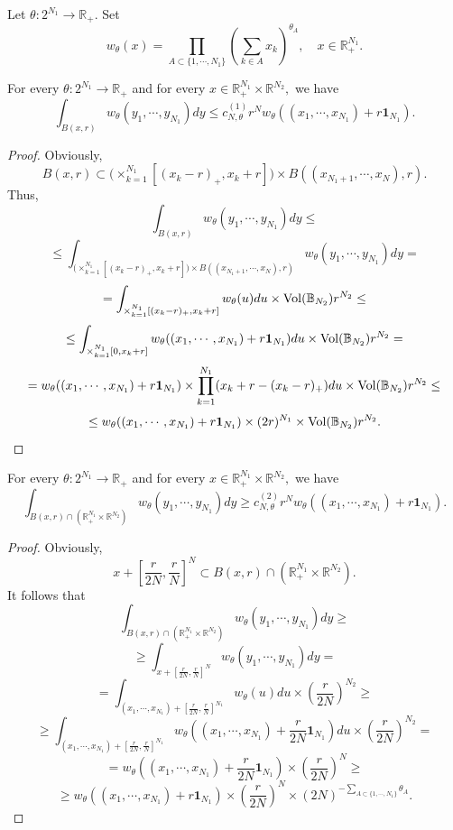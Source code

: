 \documentclass{amsart}
\begin{document}
\begin{nota} Let $\theta:2^{N_1}\to\mathbb{R}_+.$ Set
$$w_{\theta}(x)=\prod_{A\subset\{1,\cdots,N_1\}}(\sum_{k\in A}x_k)^{\theta_A},\quad x\in\mathbb{R}_+^{N_1}.$$
\end{nota}

\begin{lemma}\label{s2 upper estimate} For every $\theta:2^{N_1}\to\mathbb{R}_+$ and for every $x\in\mathbb{R}^{N_1}_+\times\mathbb{R}^{N_2},$ we have
$$\int_{B(x,r)}w_{\theta}(y_1,\cdots,y_{N_1})dy\leq c_{N,\theta}^{(1)}r^Nw_{\theta}((x_1,\cdots,x_{N_1})+r\mathbf{1}_{N_1}).$$
\end{lemma}
\begin{proof} Obviously,
$$B(x,r)\subset \Big(\times_{k=1}^{N_1}[(x_k-r)_+,x_k+r]\Big)\times B((x_{N_1+1},\cdots,x_N),r).$$
Thus,
$$\int_{B(x,r)}w_{\theta}(y_1,\cdots,y_{N_1})dy\leq$$
$$\leq\int_{\big(\times_{k=1}^{N_1}[(x_k-r)_+,x_k+r]\big)\times B((x_{N_1+1},\cdots,x_N),r)}w_{\theta}(y_1,\cdots,y_{N_1})dy=$$
$$=\int_{\times_{k=1}^{N_1}[(x_k-r)_+,x_k+r]}w_{\theta}(u)du\times {\rm Vol}(\mathbb{B}_{N_2})r^{N_2}\leq$$
$$\leq\int_{\times_{k=1}^{N_1}[0,x_k+r]}w_{\theta}((x_1,\cdots,x_{N_1})+r\mathbf{1}_{N_1})du\times {\rm Vol}(\mathbb{B}_{N_2})r^{N_2}=$$
$$=w_{\theta}((x_1,\cdots,x_{N_1})+r\mathbf{1}_{N_1})\times\prod_{k=1}^{N_1}(x_k+r-(x_k-r)_+)du\times {\rm Vol}(\mathbb{B}_{N_2})r^{N_2}\leq $$
$$\leq w_{\theta}((x_1,\cdots,x_{N_1})+r\mathbf{1}_{N_1})\times(2r)^{N_1}\times {\rm Vol}(\mathbb{B}_{N_2})r^{N_2}.$$
\end{proof}

\begin{lemma}\label{s2 lower estimate} For every $\theta:2^{N_1}\to\mathbb{R}_+$ and for every $x\in\mathbb{R}^{N_1}_+\times\mathbb{R}^{N_2},$ we have
$$\int_{B(x,r)\cap(\mathbb{R}^{N_1}_+\times\mathbb{R}^{N_2})}w_{\theta}(y_1,\cdots,y_{N_1})dy\geq c_{N,\theta}^{(2)}r^Nw_{\theta}((x_1,\cdots,x_{N_1})+r\mathbf{1}_{N_1}).$$
\end{lemma}
\begin{proof} Obviously,
$$x+[\frac{r}{2N},\frac{r}{N}]^N\subset B(x,r)\cap (\mathbb{R}^{N_1}_+\times\mathbb{R}^{N_2}).$$
It follows that
$$\int_{B(x,r)\cap(\mathbb{R}^{N_1}_+\times\mathbb{R}^{N_2})}w_{\theta}(y_1,\cdots,y_{N_1})dy\geq $$
$$\geq\int_{x+[\frac{r}{2N},\frac{r}{N}]^N}w_{\theta}(y_1,\cdots,y_{N_1})dy=$$
$$=\int_{(x_1,\cdots,x_{N_1})+[\frac{r}{2N},\frac{r}{N}]^{N_1}}w_{\theta}(u)du\times (\frac{r}{2N})^{N_2}\geq $$
$$\geq \int_{(x_1,\cdots,x_{N_1})+[\frac{r}{2N},\frac{r}{N}]^{N_1}}w_{\theta}((x_1,\cdots,x_{N_1})+\frac{r}{2N}\mathbf{1}_{N_1})du\times (\frac{r}{2N})^{N_2}=$$
$$=w_{\theta}((x_1,\cdots,x_{N_1})+\frac{r}{2N}\mathbf{1}_{N_1})\times(\frac{r}{2N})^N\geq $$
$$\geq w_{\theta}((x_1,\cdots,x_{N_1})+r\mathbf{1}_{N_1})\times(\frac{r}{2N})^N\times (2N)^{-\sum_{A\subset\{1,\cdots,N_1\}}\theta_A}.$$
\end{proof}
\end{document}
